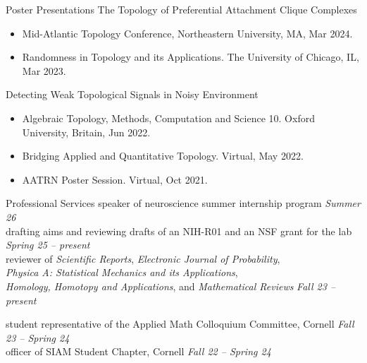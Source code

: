 \documentclass{resume} %
\begin{document}
\begin{rSection}{Poster Presentations}
The Topology of Preferential Attachment Clique Complexes
\begin{itemize}[noitemsep]
    \item Mid-Atlantic Topology Conference, Northeastern University, MA, Mar 2024.
    \item Randomness in Topology and its Applications. The University of Chicago, IL, Mar 2023.
\end{itemize}

Detecting Weak Topological Signals in Noisy Environment

\begin{itemize}[noitemsep]
    \item Algebraic Topology, Methods, Computation and Science 10. Oxford University, Britain, Jun 2022.
    \item Bridging Applied and Quantitative Topology. Virtual, May 2022.
    \item AATRN Poster Session. Virtual, Oct 2021.
\end{itemize}
\end{rSection}
\fi




\begin{rSection}{Professional Services}
speaker of neuroscience summer internship program \hfill {\em Summer 26}\\
drafting aims and reviewing drafts of an NIH-R01 and an NSF grant for the lab \hfill {\em Spring 25 -- present}\\
reviewer of \emph{Scientific Reports}, \emph{Electronic Journal of Probability}, \\
\hspace*{1cm} \emph{Physica A: Statistical Mechanics and its Applications},\\
\hspace*{1cm} \emph{Homology, Homotopy and Applications}, and \emph{Mathematical Reviews} \hfill {\em Fall 23 -- present}

student representative of the Applied Math Colloquium Committee, Cornell \hfill {\em Fall 23 -- Spring 24} \\
officer of SIAM Student Chapter, Cornell \hfill {\em Fall 22 -- Spring 24}
\end{rSection}
\end{document}
